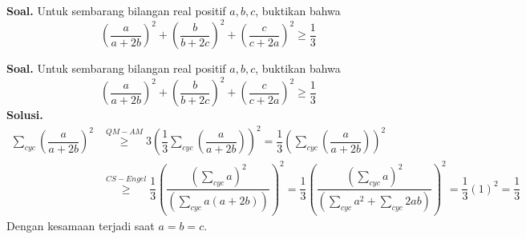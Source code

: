 	

	
		 \textbf{Soal. } Untuk sembarang bilangan real positif $a,b,c$, buktikan bahwa 
		 $$\left(\dfrac{a}{a+2b} \right)^2+\left(\dfrac{b}{b+2c} \right)^2+\left(\dfrac{c}{c+2a} \right)^2 \ge \dfrac{1}{3}$$
	
	\newpage
	
	\textbf{Soal. } Untuk sembarang bilangan real positif $a,b,c$, buktikan bahwa 
	$$\left(\dfrac{a}{a+2b} \right)^2+\left(\dfrac{b}{b+2c} \right)^2+\left(\dfrac{c}{c+2a} \right)^2 \ge \dfrac{1}{3}$$
	\textbf{Solusi. }
	\begin{align*}
		\sum_{cyc} \left(\dfrac{a}{a+2b} \right)^2 
		 &\overset{QM-AM}{\ge} 3\left(\dfrac{1}{3}\sum_{cyc} \left(\dfrac{a}{a+2b} \right)\right)^2
		 = \dfrac{1}{3}\left(\sum_{cyc} \left(\dfrac{a}{a+2b} \right)\right)^2\\
		 &\overset{CS-Engel}{\ge} \dfrac{1}{3}\left(\dfrac{\left(\sum_{cyc}a\right)^2}{\left(\sum_{cyc}a(a+2b)\right)} \right)^2
		 = \dfrac{1}{3}\left(\dfrac{\left(\sum_{cyc}a\right)^2}{\left(\sum_{cyc}a^2+\sum_{cyc}2ab\right)} \right)^2
		 = \dfrac{1}{3}(1)^2 = \dfrac{1}{3}
	\end{align*}
	Dengan kesamaan terjadi saat $a=b=c$.
	$$$$
